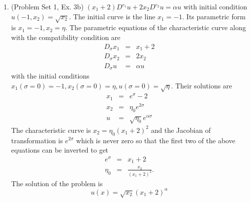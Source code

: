 \documentclass{article}
\theoremstyle{plain}
\numberwithin{thm}{section}
\theoremstyle{plain}
\numberwithin{prop}{section}
\theoremstyle{definition}
\numberwithin{defn}{section}
\theoremstyle{remark}
\numberwithin{equation}{section}
\begin{document}
\begin{enumerate}
\item (Problem Set 1, Ex. 3b) $(x_1 + 2)D^{e_1}u + 2x_2D^{e_2}u = \alpha u$ with initial condition 
$u(-1, x_2) = \sqrt{x_2}$. The initial curve is the line $x_1 = -1$. Its parametric form is $x_1 = -1,
x_2 = \eta$. The parametric equations of the characteristic curve along with the compatibility 
condition are
\begin{eqnarray}
D_\sigma x_1 &=& x_1 + 2 \label{s3e49} \\
D_\sigma x_2 &=& 2x_2 \label{s3e50} \\
D_\sigma u &=& \alpha u \label{s3e51}
\end{eqnarray}
with the initial conditions $x_1(\sigma = 0) = -1, x_2(\sigma = 0) = \eta, u(\sigma = 0) = 
\sqrt{\eta}$. Their solutions are
\begin{eqnarray}
x_1 &=& e^\sigma - 2 \label{s3e52} \\ 
x_2 &=& \eta_0 e^{2\sigma} \label{s3e53} \\
u &=& \sqrt{\eta_0}e^{\alpha\sigma} \label{s3e54}
\end{eqnarray}
The characteristic curve is $x_2 =\eta_0(x_1 + 2)^2$ and the Jacobian of transformation is $e^{2\sigma}
$ which is never zero so that the first two of the above equations can be inverted to get
\begin{eqnarray}
e^\sigma &=& x_1 + 2 \label{s3e55} \\
\eta_0 &=& \frac{x_2}{(x_1 + 2)^2}. \label{s3e56}
\end{eqnarray}
The solution of the problem is
\begin{equation}\label{s3e57}
u(x) = \sqrt{x_2}(x_1 + 2)^\alpha
\end{equation}


\end{enumerate}
\end{document}
